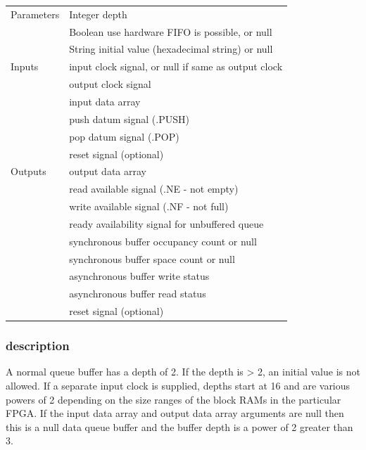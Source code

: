                 \begin{tabular}{| l | l |}
                \hline
                Parameters  & Integer depth \\
                            & Boolean use hardware FIFO is possible, or null \\
                            & String initial value (hexadecimal string) or null \\
                \hline
                Inputs      & input clock signal, or null if same as output clock \\
                            & output clock signal \\
                            & input data array \\
                            & push datum signal (.PUSH) \\
                            & pop datum signal (.POP) \\
                            & reset signal (optional) \\
                \hline
                Outputs     & output data array                          \\
                            & read available signal (.NE - not empty)  \\
                            & write available signal (.NF - not full)    \\
                            & ready availability signal for unbuffered queue \\
                            & synchronous buffer occupancy count or null \\
                            & synchronous buffer space count or null     \\
                            & asynchronous buffer write status           \\
                            & asynchronous buffer read status            \\
                            & reset signal (optional) \\
                \hline
                \end{tabular}

            \subsubsection{description}

                A normal queue buffer has a depth of 2. If the depth is > 2, an
                initial value is not allowed. If a separate input clock is
                supplied, depths start at 16 and are various powers of 2
                depending on the size ranges of the block RAMs in the particular
                FPGA. If the input data array and output data array arguments
                are null then this is a null data queue buffer and the buffer
                depth is a power of 2 greater than 3.
                
